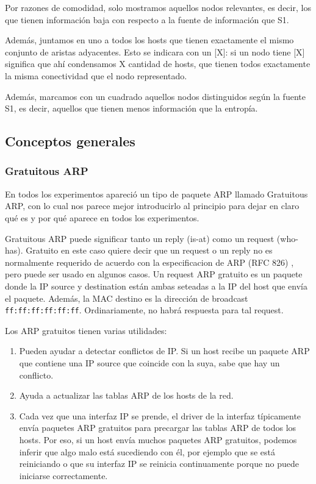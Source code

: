 Por razones de comodidad, solo mostramos aquellos nodos relevantes, es decir, los que tienen información baja con respecto a la fuente de información que S1.

Además, juntamos en uno a todos los hosts que tienen exactamente el mismo conjunto de aristas adyacentes. Esto se indicara con un [X]: si un nodo tiene [X] significa que ahí condensamos X cantidad de hosts, que tienen todos exactamente la misma conectividad que el nodo representado. 

Además, marcamos con un cuadrado aquellos nodos distinguidos según la fuente S1, es decir, aquellos que tienen menos información que la entropía.


\subsection{Conceptos generales}

\subsubsection{Gratuitous ARP}

En todos los experimentos apareció un tipo de paquete ARP llamado Gratuitous ARP, con lo cual nos parece mejor introducirlo al principio para dejar en claro qu\'e es y por qu\'e aparece en todos los experimentos.

Gratuitous ARP puede significar tanto un reply (is-at) como un request (who-has). Gratuito en este caso quiere decir que un request o un reply no es normalmente requerido de acuerdo con la especificacion de ARP (RFC 826) \cite{arp}, pero puede ser usado en algunos casos.
Un request ARP gratuito es un paquete donde la IP source y destination están ambas seteadas a la IP del host que envía el paquete. Además, la MAC destino es la dirección de broadcast \texttt{ff:ff:ff:ff:ff:ff}. Ordinariamente, no habrá respuesta para tal request.

Los ARP gratuitos tienen varias utilidades:

\begin{enumerate}
  \item Pueden ayudar a detectar conflictos de IP. Si un host recibe un paquete ARP que contiene una IP source que coincide con la suya, sabe que hay un conflicto.
  \item Ayuda a actualizar las tablas ARP de los hosts de la red.
  \item Cada vez que una interfaz IP se prende, el driver de la interfaz típicamente envía paquetes ARP gratuitos para precargar las tablas ARP de todos los hosts. Por eso, si un host envía muchos paquetes ARP gratuitos, podemos inferir que algo malo está sucediendo con \'el, por ejemplo que se está reiniciando o que su interfaz IP se reinicia continuamente porque no puede iniciarse correctamente.
\end{enumerate}


